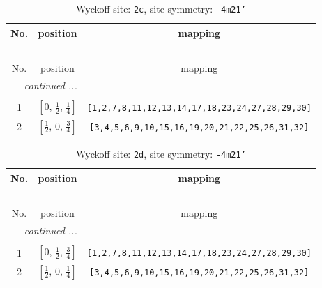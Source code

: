 \documentclass[fleqn,8pt]{jsarticle}
\begin{document}
\renewcommand{\arraystretch}{1.2}
\begin{longtable}{ccc}
\caption{Wyckoff site: {\tt 2c}, site symmetry: {\tt -4m21'}}
 \\
 \hline \hline
No. & position & mapping \\ \hline \endfirsthead

\multicolumn{2}{l}{\tablename\ \thetable{}} \\
 \hline \hline
No. & position & mapping \\ \hline \endhead

 \hline \hline
\multicolumn{2}{r}{\footnotesize\it continued ...} \\ \endfoot

 \hline \hline
\multicolumn{2}{r}{} \\ \endlastfoot

1 & $\left[ 0,\, \frac{1}{2},\, \frac{1}{4} \right]$ & {\tt [1,2,7,8,11,12,13,14,17,18,23,24,27,28,29,30]} \\ \hline
2 & $\left[ \frac{1}{2},\, 0,\, \frac{3}{4} \right]$ & {\tt [3,4,5,6,9,10,15,16,19,20,21,22,25,26,31,32]} \\
\end{longtable}
\renewcommand{\arraystretch}{1.2}
\begin{longtable}{ccc}
\caption{Wyckoff site: {\tt 2d}, site symmetry: {\tt -4m21'}}
 \\
 \hline \hline
No. & position & mapping \\ \hline \endfirsthead

\multicolumn{2}{l}{\tablename\ \thetable{}} \\
 \hline \hline
No. & position & mapping \\ \hline \endhead

 \hline \hline
\multicolumn{2}{r}{\footnotesize\it continued ...} \\ \endfoot

 \hline \hline
\multicolumn{2}{r}{} \\ \endlastfoot

1 & $\left[ 0,\, \frac{1}{2},\, \frac{3}{4} \right]$ & {\tt [1,2,7,8,11,12,13,14,17,18,23,24,27,28,29,30]} \\ \hline
2 & $\left[ \frac{1}{2},\, 0,\, \frac{1}{4} \right]$ & {\tt [3,4,5,6,9,10,15,16,19,20,21,22,25,26,31,32]} \\
\end{longtable}
\renewcommand{\arraystretch}{1.2}
\end{document}

